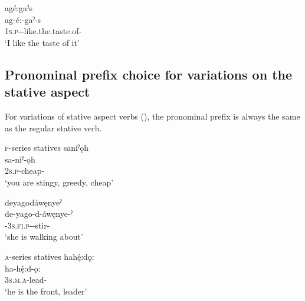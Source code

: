 \ex agé:gaˀs\\
\gll ag-é:-gaˀ-s\\
 \textsc{1s.p}-{\joinerE}-like.the.taste.of-{\habitual}\\
\glt `I like the taste of it'

\z
\z


\subsection{Pronominal prefix choice for variations on the stative aspect} \label{Pronominal prefix selection for variations on the stative aspect}
For variations of stative aspect verbs (), the pronominal prefix is always the same as the regular stative verb.
\newpage

\ea\label{ex:3aspvarex5} \textsc{p}-series statives
\ea saníˀǫh\\
\gll sa-níˀ-ǫh\\
 \textsc{2s.p}-cheap-{\stative}\\
\glt `you are stingy, greedy, cheap'

\ex deyagodáwęnyeˀ\\
\gll de-yago-d-áwęnye-ˀ\\
 {\dualic}-\textsc{3s.fi.p}-{\semireflexive}-stir-{\stative}\\
\glt `she is walking about'

\z
\z

\ea\label{ex:3aspvarex7} \textsc{a}-series statives
\ea hahę́:dǫ:\\
\gll ha-hę́:d-ǫ:\\
 \textsc{3s.m.a}-lead-{\stative}\\
\glt `he is the front, leader'

